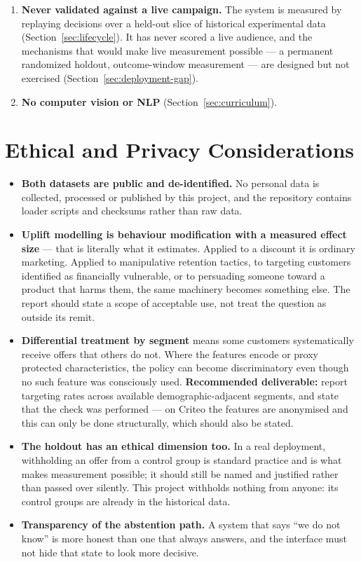 \documentclass[11pt,a4paper]{article}
\begin{document}
\begin{enumerate}
times the never-takers' --- so the estimate describes a strongly self-selected minority and says
nothing about the other $96\%$. An earlier version of this document called the same estimate ``not
credible''; that judgement came from dividing it by the wrong baseline and has been withdrawn.
\item \textbf{Never validated against a live campaign.} The system is measured by replaying
decisions over a held-out slice of historical experimental data (Section~\ref{sec:lifecycle}). It
has never scored a live audience, and the mechanisms that would make live measurement possible ---
a permanent randomized holdout, outcome-window measurement --- are designed but not exercised
(Section~\ref{sec:deployment-gap}).
\item \textbf{No computer vision or NLP} (Section~\ref{sec:curriculum}).
\end{enumerate}

\section{Ethical and Privacy Considerations}

\begin{itemize}
\item \textbf{Both datasets are public and de-identified.} No personal data is collected, processed
or published by this project, and the repository contains loader scripts and checksums rather than
raw data.
\item \textbf{Uplift modelling is behaviour modification with a measured effect size} --- that is
literally what it estimates. Applied to a discount it is ordinary marketing. Applied to
manipulative retention tactics, to targeting customers identified as financially vulnerable, or to
persuading someone toward a product that harms them, the same machinery becomes something else.
The report should state a scope of acceptable use, not treat the question as outside its remit.
\item \textbf{Differential treatment by segment} means some customers systematically receive offers
that others do not. Where the features encode or proxy protected characteristics, the policy can
become discriminatory even though no such feature was consciously used. \textbf{Recommended
deliverable:} report targeting rates across available demographic-adjacent segments, and state
that the check was performed --- on Criteo the features are anonymised and this can only be done
structurally, which should also be stated.
\item \textbf{The holdout has an ethical dimension too.} In a real deployment, withholding an offer
from a control group is standard practice and is what makes measurement possible; it should still
be named and justified rather than passed over silently. This project withholds nothing from anyone:
its control groups are already in the historical data.
\item \textbf{Transparency of the abstention path.} A system that says ``we do not know'' is more
honest than one that always answers, and the interface must not hide that state to look more
decisive.
\end{itemize}
\end{document}
